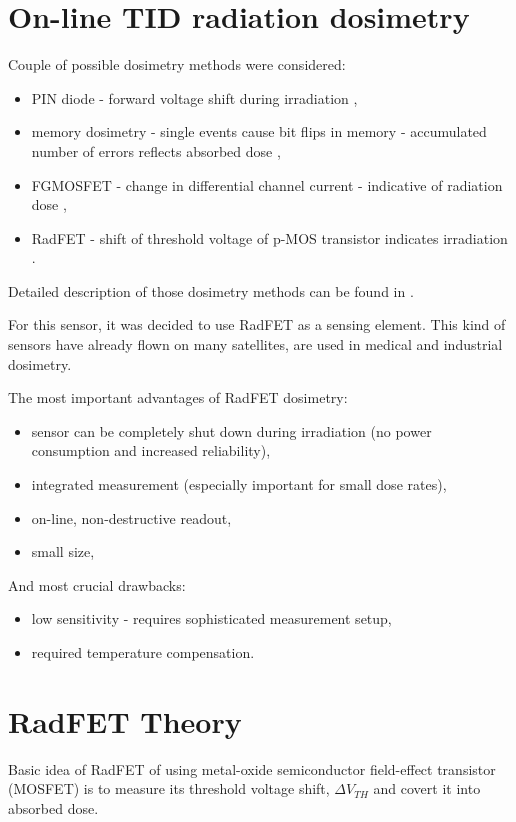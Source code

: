 \section{On-line TID radiation dosimetry}
    Couple of possible dosimetry methods were considered:
    \begin{itemize}
        \item PIN diode - forward voltage shift during irradiation \cite{PIN_dosimetry},
        \item memory dosimetry - single events cause bit flips in memory - accumulated number of errors reflects absorbed dose \cite{RadFET_PhD},
        \item FGMOSFET - change in differential channel current - indicative of radiation dose \cite{FGMOSFET_patent},
        \item RadFET - shift of threshold voltage of p-MOS transistor indicates irradiation \cite{RadFET_PhD}.
    \end{itemize}
    Detailed description of those dosimetry methods can be found in \cite{RadFET_PhD}.

    For this sensor, it was decided to use RadFET as a sensing element. This kind of sensors have already flown on many satellites, are used in medical and industrial dosimetry.

    The most important advantages of RadFET dosimetry:
    \begin{itemize}
        \item sensor can be completely shut down during irradiation (no power consumption and increased reliability),
        \item integrated measurement (especially important for small dose rates),
        \item on-line, non-destructive readout,
        \item small size,
    \end{itemize}
    And most crucial drawbacks:
    \begin{itemize}
        \item low sensitivity - requires sophisticated measurement setup,
        \item required temperature compensation.
    \end{itemize}


\section{RadFET Theory}
    Basic idea of RadFET of using metal-oxide semiconductor field-effect transistor (MOSFET) is to measure its threshold voltage shift, $\Delta V_{TH}$ and covert it into absorbed dose.

